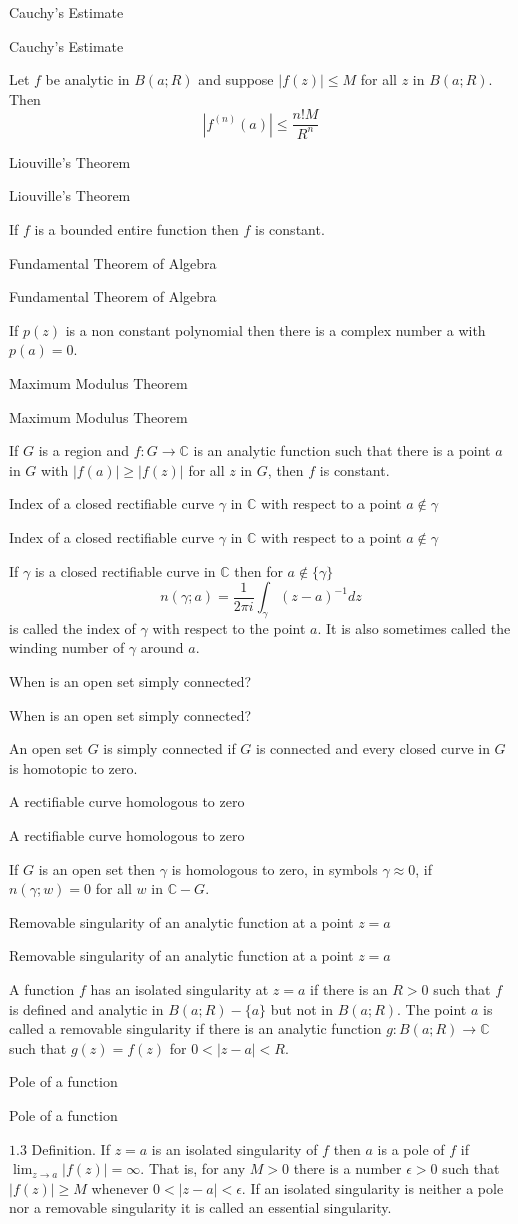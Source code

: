 \documentclass[17pt]{extarticle}
\newcommand{\boxset}[2]{\begin{mdframed}[style=darkQuesion]
  #1
    \end{mdframed}
    \newpage
    \begin{mdframed}[style=darkQuesion]
      #1
        \end{mdframed}
    \begin{mdframed}[style=darkAnswer]
      #2
        \end{mdframed}
        \newpage
  }
\begin{document}
\boxset{Cauchy's Estimate}
{ Let $f$ be analytic in $B(a ; R)$ and suppose $|f(z)| \leq M$ for all $z$ in $B(a ; R)$. Then
$$
\left|f^{(n)}(a)\right| \leq \frac{n ! M}{R^{n}}
$$}
\boxset{Liouville's Theorem}
{ If $f$ is a bounded entire function then $f$ is constant.}
\boxset{Fundamental Theorem of Algebra}
{ If $p(z)$ is a non constant polynomial then there is a complex number a with $p(a)=0$.}
\boxset{Maximum Modulus Theorem}
{ If $G$ is a region and $f: G \rightarrow \mathbb{C}$ is an analytic function such that there is a point $a$ in $G$ with $|f(a)| \geq|f(z)|$ for all $z$ in $G$, then $f$ is constant.}
\boxset{Index of a closed rectifiable curve $\gamma$ in $\mathbb{C}$ with respect to a point $a \notin \gamma$}
{ If $\gamma$ is a closed rectifiable curve in $\mathbb{C}$ then for $a \notin\{\gamma\}$
$$
n(\gamma ; a)=\frac{1}{2 \pi i} \int_{\gamma}(z-a)^{-1} d z
$$
is called the index of $\gamma$ with respect to the point $a$. It is also sometimes called the winding number of $\gamma$ around $a$.}
\boxset{When is an open set simply connected?}
{ An open set $G$ is simply connected if $G$ is connected and every closed curve in $G$ is homotopic to zero.}
\boxset{A rectifiable curve homologous to zero}
{ If $G$ is an open set then $\gamma$ is homologous to zero, in symbols $\gamma \approx 0$, if $n(\gamma ; w)=0$ for all $w$ in $\mathbb{C}-G$.}
\boxset{Removable singularity of an analytic function at a point $z=a$}
{ A function $f$ has an isolated singularity at $z=a$ if there is an $R>0$ such that $f$ is defined and analytic in $B(a ; R)-\{a\}$ but not in $B(a ; R)$. The point $a$ is called a removable singularity if there is an analytic function $g: B(a ; R) \rightarrow \mathbb{C}$ such that $g(z)=f(z)$ for $0<|z-a|<R$.}
\boxset{Pole of a function}
{$1.3$ Definition. If $z=a$ is an isolated singularity of $f$ then $a$ is a pole of $f$ if $\lim _{z \rightarrow a}|f(z)|=\infty$. That is, for any $M>0$ there is a number $\epsilon>0$ such that $|f(z)| \geq M$ whenever $0<|z-a|<\epsilon$. If an isolated singularity is neither a pole nor a removable singularity it is called an essential singularity.}
\end{document}
